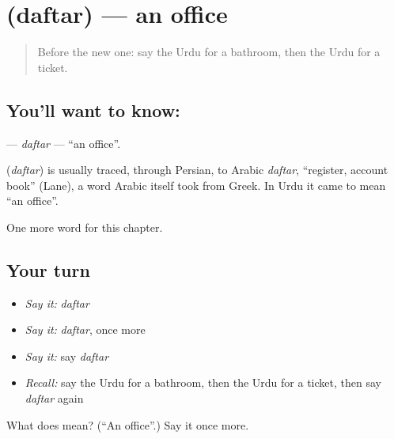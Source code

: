 \section[\texorpdfstring{\ur{دفتر} (daftar)}{دفتر (daftar)}]{ (daftar) — an office}

\label{lesson:UR-C102-daftar}



\begin{quote}
Before the new one: say the Urdu for a bathroom, then the Urdu for a ticket.
\end{quote}

\subsection*{You'll want to know: }
\textbf{} — \emph{daftar} — \textquotedblleft{}an office\textquotedblright{}.

\begin{cousinweb}
\textbf{} (\emph{daftar}) is usually traced, through Persian, to Arabic \emph{daftar}, \textquotedblleft{}register, account book\textquotedblright{} (Lane), a word Arabic itself took from Greek. In Urdu it came to mean \textquotedblleft{}an office\textquotedblright{}.
\end{cousinweb}

\begin{grammarlens}[title={What you've built}]
One more word for this chapter.
\end{grammarlens}

\subsection*{Your turn}
\begin{itemize}
\raggedright
  \item \emph{Say it:} \emph{daftar}
  \item \emph{Say it:} \emph{daftar}, once more
  \item \emph{Say it:} say \emph{daftar}
  \item \emph{Recall:} say the Urdu for a bathroom, then the Urdu for a ticket, then say \emph{daftar} again
\end{itemize}

\begin{tcolorbox}[breakable,colback=teal!4,colframe=teal!35!black,title={Before you move on}]
What does  mean? (\textquotedblleft{}An office\textquotedblright{}.) Say it once more.
\end{tcolorbox}
